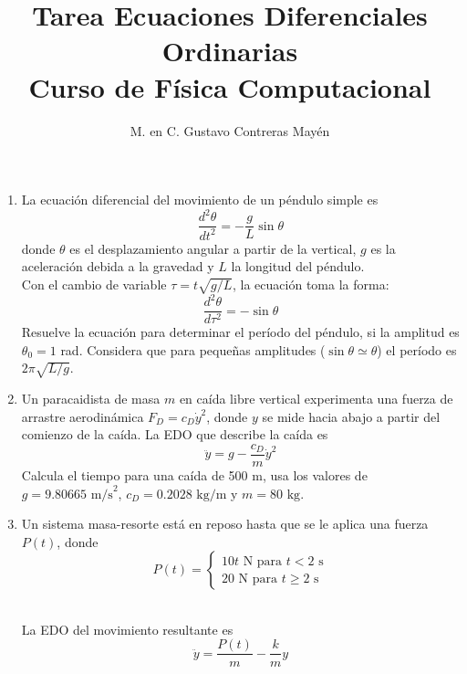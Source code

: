 \documentclass[11pt]{article}
\title{Tarea Ecuaciones Diferenciales Ordinarias \\ Curso de Física Computacional}
\author{M. en C. Gustavo Contreras May\'{e}n}
\date{ }
\begin{document}
\maketitle
\fontsize{14}{14}\selectfont
\begin{enumerate}
\item La ecuaci\'{o}n diferencial del movimiento de un p\'{e}ndulo simple es
\[ \dfrac{d^{2} \theta}{d t^{2}} = - \dfrac{g}{L} \sin \theta \]
donde
$\theta$ es el desplazamiento angular a partir de la vertical, $g$ es la aceleraci\'{o}n debida a la gravedad y $L$ la longitud del p\'{e}ndulo.
\\
Con el cambio de variable $\tau = t \sqrt{g/L}$, la ecuaci\'{o}n toma la forma:
\[ \dfrac{d^{2} \theta}{d \tau^{2}} = -  \sin \theta\]
Resuelve la ecuaci\'{o}n para determinar el per\'{i}odo del p\'{e}ndulo, si la amplitud es $\theta_{0} = 1$ rad. Considera que para pequeñas amplitudes ($\sin \theta \simeq \theta$) el per\'{i}odo es $2 \pi \sqrt{L/g}$.
\item Un paracaidista de masa $m$ en ca\'{i}da libre vertical experimenta una fuerza de arrastre aerodin\'{a}mica $F_{D} = c_{D} \dot{y}^{2}$, donde $y$ se mide hacia abajo a partir del comienzo de la ca\'{i}da. La EDO que describe la ca\'{i}da es
\[ \ddot{y} = g - \dfrac{c_{D}}{m} \dot{y}^{2}\]
Calcula el tiempo para una ca\'{i}da de 500 m, usa los valores de $g=9.80665 \mbox{ m/s}^{2}$, $c_{D}=0.2028 \mbox{ kg/m}$ y $m=80 \mbox{ kg}$.
\item Un sistema masa-resorte est\'{a} en reposo hasta que se le aplica una fuerza $P(t)$, donde
\[ P(t) = \begin{cases}
10 t \mbox{ N para } t < 2 \mbox{ s} \\
20 \mbox{ N para } t \geq 2 \mbox{ s}
\end{cases} \]
\\
\begin{center}
\end{center}
La EDO del movimiento resultante es
\[  \ddot{y} = \dfrac{P(t)}{m} - \dfrac{k}{m} y\]

\end{enumerate}
\end{document}
